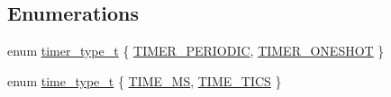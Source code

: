 \subsection*{Enumerations}
\begin{DoxyCompactItemize}
\item 
enum \hyperlink{group___open_timers_ga66e6b1d10289945ae9284d769f136e59}{timer\+\_\+type\+\_\+t} \{ \hyperlink{group___open_timers_gga66e6b1d10289945ae9284d769f136e59a21b44bcff4202d25ac1a56331ab4f841}{T\+I\+M\+E\+R\+\_\+\+P\+E\+R\+I\+O\+D\+IC}, 
\hyperlink{group___open_timers_gga66e6b1d10289945ae9284d769f136e59aea25032a4fb8ae276245050c0648327c}{T\+I\+M\+E\+R\+\_\+\+O\+N\+E\+S\+H\+OT}
 \}
\item 
enum \hyperlink{group___open_timers_gad4702b7e72b77cd1d6cf3a63c0db9df8}{time\+\_\+type\+\_\+t} \{ \hyperlink{group___open_timers_ggad4702b7e72b77cd1d6cf3a63c0db9df8ab2234de0b81a6c02ab51dcfc63065bca}{T\+I\+M\+E\+\_\+\+MS}, 
\hyperlink{group___open_timers_ggad4702b7e72b77cd1d6cf3a63c0db9df8a355f8cf3694e6ce36571b43db20b6717}{T\+I\+M\+E\+\_\+\+T\+I\+CS}
 \}
\end{DoxyCompactItemize}
